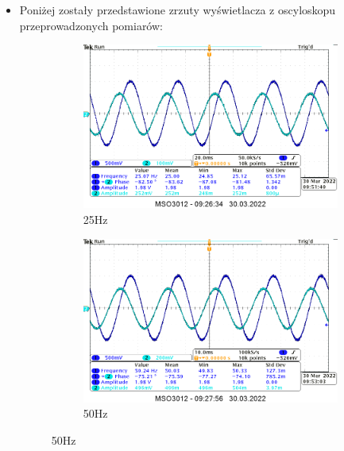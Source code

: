 \begin{itemize}
    \item Poniżej zostały przedstawione zrzuty wyświetlacza z oscyloskopu przeprowadzonych pomiarów:
    {
    \begin{figure}[H]
        \centering
        \begin{subfigure}[h]{0.45\textwidth}
            \includegraphics[width=\textwidth]{img_osciloscope/CR/CR_25Hz_cropped.png}
            \caption*{25Hz}
        \end{subfigure}
        \begin{subfigure}[h]{0.45\textwidth}
            \includegraphics[width=\textwidth]{img_osciloscope/CR/CR_50Hz_differentscale_cropped.png}
            \caption*{50Hz}
        \end{subfigure}
    \end{figure}
    
}
\end{itemize}
